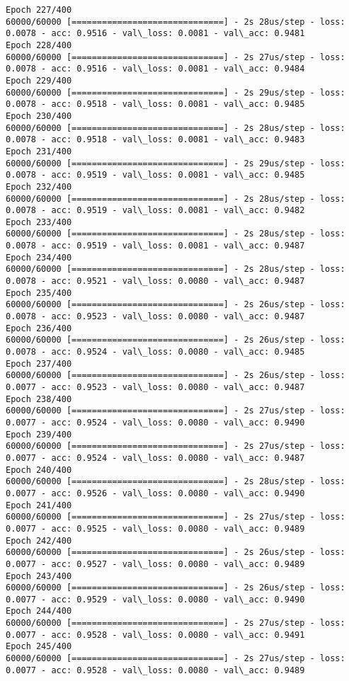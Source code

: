 \documentclass[11pt]{article}
\begin{document}
\begin{Verbatim}[commandchars=\\\{\}]
Epoch 227/400
60000/60000 [==============================] - 2s 28us/step - loss: 0.0078 - acc: 0.9516 - val\_loss: 0.0081 - val\_acc: 0.9481
Epoch 228/400
60000/60000 [==============================] - 2s 27us/step - loss: 0.0078 - acc: 0.9516 - val\_loss: 0.0081 - val\_acc: 0.9484
Epoch 229/400
60000/60000 [==============================] - 2s 29us/step - loss: 0.0078 - acc: 0.9518 - val\_loss: 0.0081 - val\_acc: 0.9485
Epoch 230/400
60000/60000 [==============================] - 2s 28us/step - loss: 0.0078 - acc: 0.9518 - val\_loss: 0.0081 - val\_acc: 0.9483
Epoch 231/400
60000/60000 [==============================] - 2s 29us/step - loss: 0.0078 - acc: 0.9519 - val\_loss: 0.0081 - val\_acc: 0.9485
Epoch 232/400
60000/60000 [==============================] - 2s 28us/step - loss: 0.0078 - acc: 0.9519 - val\_loss: 0.0081 - val\_acc: 0.9482
Epoch 233/400
60000/60000 [==============================] - 2s 28us/step - loss: 0.0078 - acc: 0.9519 - val\_loss: 0.0081 - val\_acc: 0.9487
Epoch 234/400
60000/60000 [==============================] - 2s 28us/step - loss: 0.0078 - acc: 0.9521 - val\_loss: 0.0080 - val\_acc: 0.9487
Epoch 235/400
60000/60000 [==============================] - 2s 26us/step - loss: 0.0078 - acc: 0.9523 - val\_loss: 0.0080 - val\_acc: 0.9487
Epoch 236/400
60000/60000 [==============================] - 2s 26us/step - loss: 0.0078 - acc: 0.9524 - val\_loss: 0.0080 - val\_acc: 0.9485
Epoch 237/400
60000/60000 [==============================] - 2s 26us/step - loss: 0.0077 - acc: 0.9523 - val\_loss: 0.0080 - val\_acc: 0.9487
Epoch 238/400
60000/60000 [==============================] - 2s 27us/step - loss: 0.0077 - acc: 0.9524 - val\_loss: 0.0080 - val\_acc: 0.9490
Epoch 239/400
60000/60000 [==============================] - 2s 27us/step - loss: 0.0077 - acc: 0.9524 - val\_loss: 0.0080 - val\_acc: 0.9487
Epoch 240/400
60000/60000 [==============================] - 2s 28us/step - loss: 0.0077 - acc: 0.9526 - val\_loss: 0.0080 - val\_acc: 0.9490
Epoch 241/400
60000/60000 [==============================] - 2s 27us/step - loss: 0.0077 - acc: 0.9525 - val\_loss: 0.0080 - val\_acc: 0.9489
Epoch 242/400
60000/60000 [==============================] - 2s 26us/step - loss: 0.0077 - acc: 0.9527 - val\_loss: 0.0080 - val\_acc: 0.9489
Epoch 243/400
60000/60000 [==============================] - 2s 26us/step - loss: 0.0077 - acc: 0.9529 - val\_loss: 0.0080 - val\_acc: 0.9490
Epoch 244/400
60000/60000 [==============================] - 2s 27us/step - loss: 0.0077 - acc: 0.9528 - val\_loss: 0.0080 - val\_acc: 0.9491
Epoch 245/400
60000/60000 [==============================] - 2s 27us/step - loss: 0.0077 - acc: 0.9528 - val\_loss: 0.0080 - val\_acc: 0.9489

\end{Verbatim}
\end{document}
